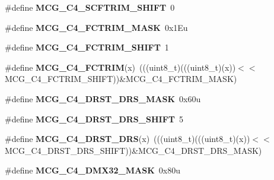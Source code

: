 \begin{DoxyCompactItemize}
\item 
\#define {\bfseries M\+C\+G\+\_\+\+C4\+\_\+\+S\+C\+F\+T\+R\+I\+M\+\_\+\+S\+H\+I\+FT}~0\hypertarget{group__MCG__Register__Masks_ga1114052674119b01137ef4b4885ab757}{}\label{group__MCG__Register__Masks_ga1114052674119b01137ef4b4885ab757}

\item 
\#define {\bfseries M\+C\+G\+\_\+\+C4\+\_\+\+F\+C\+T\+R\+I\+M\+\_\+\+M\+A\+SK}~0x1\+Eu\hypertarget{group__MCG__Register__Masks_ga91610035649d14c5027419db0bfa3231}{}\label{group__MCG__Register__Masks_ga91610035649d14c5027419db0bfa3231}

\item 
\#define {\bfseries M\+C\+G\+\_\+\+C4\+\_\+\+F\+C\+T\+R\+I\+M\+\_\+\+S\+H\+I\+FT}~1\hypertarget{group__MCG__Register__Masks_ga0a1b1f2be0b8e9afc3ff91ab11d71a1e}{}\label{group__MCG__Register__Masks_ga0a1b1f2be0b8e9afc3ff91ab11d71a1e}

\item 
\#define {\bfseries M\+C\+G\+\_\+\+C4\+\_\+\+F\+C\+T\+R\+IM}(x)~(((uint8\+\_\+t)(((uint8\+\_\+t)(x))$<$$<$M\+C\+G\+\_\+\+C4\+\_\+\+F\+C\+T\+R\+I\+M\+\_\+\+S\+H\+I\+FT))\&M\+C\+G\+\_\+\+C4\+\_\+\+F\+C\+T\+R\+I\+M\+\_\+\+M\+A\+SK)\hypertarget{group__MCG__Register__Masks_ga7ffe6f164c3d7440b9911c8de59b7171}{}\label{group__MCG__Register__Masks_ga7ffe6f164c3d7440b9911c8de59b7171}

\item 
\#define {\bfseries M\+C\+G\+\_\+\+C4\+\_\+\+D\+R\+S\+T\+\_\+\+D\+R\+S\+\_\+\+M\+A\+SK}~0x60u\hypertarget{group__MCG__Register__Masks_ga7f6629e8d17efb2cec3d2f63d09ede5a}{}\label{group__MCG__Register__Masks_ga7f6629e8d17efb2cec3d2f63d09ede5a}

\item 
\#define {\bfseries M\+C\+G\+\_\+\+C4\+\_\+\+D\+R\+S\+T\+\_\+\+D\+R\+S\+\_\+\+S\+H\+I\+FT}~5\hypertarget{group__MCG__Register__Masks_ga27d4baa0c8a770f1f67ab47e6407e948}{}\label{group__MCG__Register__Masks_ga27d4baa0c8a770f1f67ab47e6407e948}

\item 
\#define {\bfseries M\+C\+G\+\_\+\+C4\+\_\+\+D\+R\+S\+T\+\_\+\+D\+RS}(x)~(((uint8\+\_\+t)(((uint8\+\_\+t)(x))$<$$<$M\+C\+G\+\_\+\+C4\+\_\+\+D\+R\+S\+T\+\_\+\+D\+R\+S\+\_\+\+S\+H\+I\+FT))\&M\+C\+G\+\_\+\+C4\+\_\+\+D\+R\+S\+T\+\_\+\+D\+R\+S\+\_\+\+M\+A\+SK)\hypertarget{group__MCG__Register__Masks_gaf074d694a596e6e92614fd435c9ccb35}{}\label{group__MCG__Register__Masks_gaf074d694a596e6e92614fd435c9ccb35}

\item 
\#define {\bfseries M\+C\+G\+\_\+\+C4\+\_\+\+D\+M\+X32\+\_\+\+M\+A\+SK}~0x80u\hypertarget{group__MCG__Register__Masks_ga5d16ac35cf87b3cdeeefca1c16a0eda0}{}\label{group__MCG__Register__Masks_ga5d16ac35cf87b3cdeeefca1c16a0eda0}


\end{DoxyCompactItemize}
